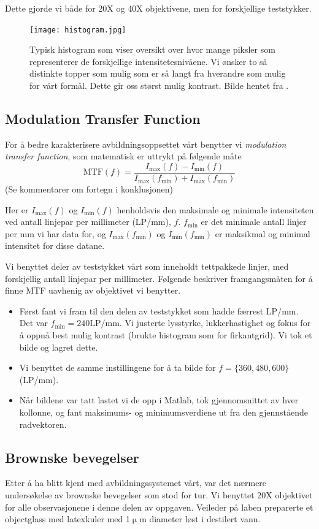 \documentclass[a4paper,11pt, twocolumn]{article}
\begin{document}
Dette gjorde vi både for 20X og 40X objektivene, men for forskjellige teststykker.
\begin{figure}[!ht]
	\centering
	\texttt{[image: histogram.jpg]}
	\caption{Typisk histogram som viser oversikt over hvor mange piksler som representerer de forskjellige intensitetesnivåene. Vi ønsker to så distinkte topper som mulig som er så langt fra hverandre som mulig for vårt formål. Dette gir oss størst mulig kontrast. Bilde hentet fra \cite{histogram}.}
	\label{fig:histogram}
\end{figure}
\subsection{Modulation Transfer Function}
For å bedre karakterisere avbildningsoppsettet vårt benytter vi \textit{modulation transfer function}, som matematisk er uttrykt på følgende måte
\begin{equation}
	\text{MTF}(f) = \frac{I_{\max}(f)-I_{\min}(f)}{I_{\max}(f_{\min})+I_{\max}(f_{\min})}
	\label{eq:MTF}
\end{equation}
(Se kommentarer om fortegn i konklusjonen)

Her er $I_{\text{max}}(f)$ og $I_\text{min}(f)$ henholdsvis den maksimale og minimale intensiteten ved antall linjepar per millimeter (LP/mm), $f$. $f_\text{min}$ er det minimale antall linjer per mm vi har data for, og $I_\text{max}(f_\text{min})$ og $I_\text{min}(f_\text{min})$ er maksikmal og minimal intensitet for disse datane.

Vi benyttet deler av teststykket vårt som inneholdt tettpakkede linjer, med forskjellig antall linjepar per millimeter. Følgende beskriver framgangsmåten for å finne MTF uavhenig av objektivet vi benytter.  
\begin{itemize}
	\item Først fant vi fram til den delen av teststykket som hadde færrest LP/mm. Det var $f_\text{min} = 240\text{LP/mm}$. Vi justerte lysstyrke, lukkerhastighet og fokus for å oppnå best mulig kontrast (brukte histogram som for firkantgrid). Vi tok et bilde og lagret dette.
	\item Vi benyttet de samme instillingene for å ta bilde for $f = \{360, 480, 600\}$(LP/mm). 
	\item Når bildene var tatt lastet vi de opp i Matlab, tok gjennomsnittet av hver kollonne, og fant maksimums- og minimumsverdiene ut fra den gjennstående radvektoren.
\end{itemize}
\subsection{Brownske bevegelser}
\label{sek:EksBrownske}
Etter å ha blitt kjent med avbildningssystemet vårt, var det nærmere undersøkelse av brownske bevegelser som stod for tur. Vi benyttet 20X objektivet for alle observasjonene i denne delen av oppgaven. Veileder på laben preparerte et objectglass med latexkuler med 1$\upmu$m diameter løst i destilert vann.
\end{document}
